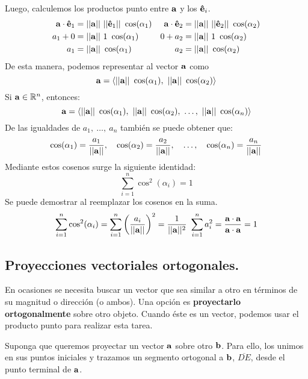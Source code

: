 \documentclass[12pt]{article}
\begin{document}
Luego, calculemos los productos punto entre $\mathbf{a}$ y los $\mathbf{\hat{e}}_{i}$.
\begin{align*}
\vecmat{a} \cdot \vecmat{\hat{e}}_{1} &= ||\vecmat{a}|| \ ||\vecmat{\hat{e}}_{1}|| \ \cos(\alpha_{1}) &
\vecmat{a} \cdot \vecmat{\hat{e}}_{2} &= ||\vecmat{a}|| \ ||\vecmat{\hat{e}}_{2}|| \ \cos(\alpha_{2}) \\
a_{1} + 0 &= ||\vecmat{a}|| \ 1 \ \cos(\alpha_{1}) &
0 + a_{2} &= ||\vecmat{a}|| \ 1 \ \cos(\alpha_{2}) \\
a_{1} &= ||\vecmat{a}|| \ \cos(\alpha_{1}) &
a_{2} &= ||\vecmat{a}|| \ \cos(\alpha_{2})
\end{align*}
De esta manera, podemos representar al vector $\mathbf{a}$ como
\[
  \vecmat{a} = \langle ||\vecmat{a}|| \ \cos(\alpha_{1}), \ ||\vecmat{a}|| \ \cos(\alpha_{2}) \rangle
\]
Si $\mathbf{a} \in \mathbb{R}^{n}$, entonces:
\[
  \vecmat{a} = \langle ||\vecmat{a}|| \ \cos(\alpha_{1}), \ ||\vecmat{a}|| \ \cos(\alpha_{2}),
                       \ \ldots, \ ||\vecmat{a}|| \ \cos(\alpha_{n}) \rangle
\]
De las igualdades de $a_{1}, \ \ldots, \ a_{n}$ también se puede obtener que:
\[
  \cos(\alpha_{1}) = \frac{a_{1}}{||\mathbf{a}||}, \quad \cos(\alpha_{2}) = \frac{a_{2}}{||\mathbf{a}||},
                     \quad \ldots, \quad \cos(\alpha_{n}) = \frac{a_{n}}{||\mathbf{a}||}
\]
Mediante estos cosenos surge la siguiente identidad:
\[
  \sum_{i = 1}^{n} \cos^{2}(\alpha_{i}) = 1
\]
Se puede demostrar al reemplazar los cosenos en la suma.
\begin{align*}
  \sum_{i = 1}^{n} \cos^{2}(\alpha_{i}) = \sum_{i = 1}^{n} \left(\frac{a_{i}}{||\vecmat{a}||}\right)^{2}
                                        = \frac{1}{||\vecmat{a}||^{2}} \ \sum_{i = 1}^{n} a_{i}^{2}
                                        = \frac{\vecmat{a} \cdot \vecmat{a}}{\vecmat{a} \cdot \vecmat{a}}
                                        = 1
\end{align*}

\subsection{Proyecciones vectoriales ortogonales.}

En ocasiones se necesita buscar un vector que sea similar a otro en términos de su magnitud o dirección (o ambos). Una opción es \textbf{proyectarlo ortogonalmente} sobre otro objeto. Cuando éste es un vector, podemos usar el producto punto para realizar esta tarea.

Suponga que queremos proyectar un vector $\mathbf{a}$ sobre otro $\mathbf{b}$. Para ello, los unimos en sus puntos iniciales y trazamos un segmento ortogonal a $\mathbf{b}$, $\overline{DE}$, desde el punto terminal de $\mathbf{a}$.
\end{document}
